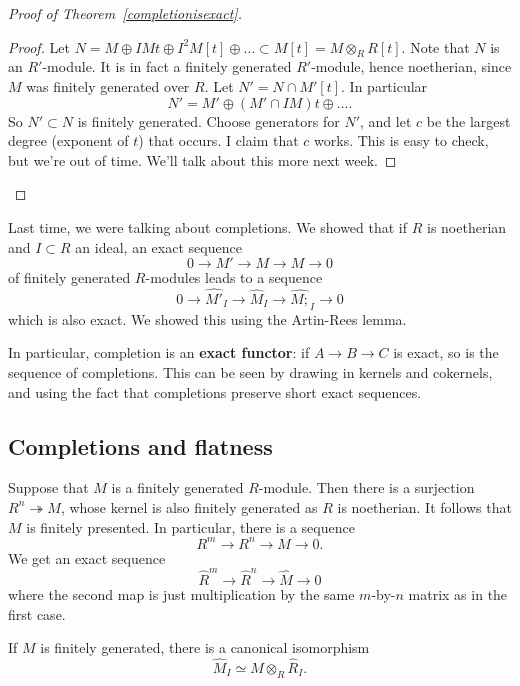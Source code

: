 \begin{proof}[Proof of Theorem~\ref{completionisexact}]
\begin{proof}
Let $N = M \oplus  IM t \oplus I^2 M [t] \oplus \dots \subset M[t] = M
\otimes_R R[t]$. Note that $N$ is an $R'$-module. It is in fact a finitely
generated $R'$-module, hence noetherian, since $M$ was finitely generated over
$R$. Let $N' = N \cap M'[t]$. In particular
\[ N' = M' \oplus (M' \cap IM ) t \oplus \dots.  \]
So $N' \subset N$ is finitely generated. Choose generators for $N'$, and let
$c$ be the largest degree (exponent of $t$) that occurs.
I claim that $c$ works.  This is easy to check, but we're out of time. We'll
talk about this more next week. 
\end{proof} 
\end{proof} 

Last time, we were talking about completions. We showed that if $R$ is
noetherian and $I \subset R$ an ideal, an exact sequence
\[ 0 \to M' \to M \to M \to 0   \]
of finitely generated $R$-modules leads to a sequence
\[ 0 \to \hat{M'}_I \to \hat{M}_I \to \hat{M;}_I \to 0  \]
which is also exact. We showed this using the Artin-Rees lemma.

\begin{remark}
In particular, completion is an \textbf{exact functor}: if $A \to B \to C$ is
exact, so is the sequence of completions. This can be seen by drawing in
kernels and cokernels, and using the fact that completions preserve short
exact sequences. 
\end{remark}

\subsection{Completions and flatness}

Suppose that $M$ is a finitely generated $R$-module. Then there is a surjection $R^n
\twoheadrightarrow M$, whose kernel is also finitely generated as $R$ is
noetherian. It follows that
$M$ is finitely presented. In particular, there is a sequence
\[ R^m \to R^n \to M \to 0.  \]
We get an exact sequence
\[ \hat{R}^m \to \hat{R}^n \to \hat{M} \to 0  \]
where the second map is just multiplication by the same $m$-by-$n$ matrix as in
the first case.

\begin{corollary} 
If $M$ is finitely generated, there is a canonical isomorphism
\[ \hat{M}_I \simeq M \otimes_R \hat{R}_I.  \]
\end{corollary} 


